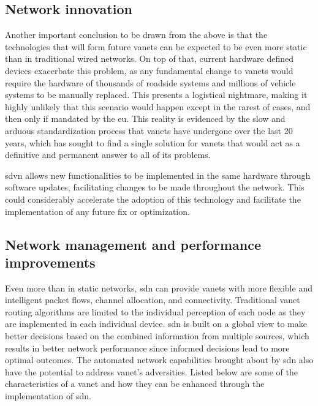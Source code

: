 \subsection{Network innovation}

Another important conclusion to be drawn from the above is that the technologies that will form future \glspl{vanet} can be expected to be even more static than in traditional wired networks. On top of that, current hardware defined devices exacerbate this problem, as any fundamental change to \glspl{vanet} would require the hardware of thousands of roadside systems and millions of vehicle systems to be manually replaced. This presents a logistical nightmare, making it highly unlikely that this scenario would happen except in the rarest of cases, and then only if mandated by the \gls{eu}. This reality is evidenced by the slow and arduous standardization process that \glspl{vanet} have undergone over the last 20 years, which has sought to find a single solution for \glspl{vanet} that would act as a definitive and permanent answer to all of its problems. 

\gls{sdvn} allows new functionalities to be implemented in the same hardware through software updates, facilitating changes to be made throughout the network. This could considerably accelerate the adoption of this technology and facilitate the implementation of any future fix or optimization.

\subsection{Network management and performance improvements}

Even more than in static networks, \gls{sdn} can provide \glspl{vanet} with more flexible and intelligent packet flows, channel allocation, and connectivity. Traditional \gls{vanet} routing algorithms are limited to the individual perception of each node as they are implemented in each individual device. \gls{sdn} is built on a global view to make better decisions based on the combined information from multiple sources, which results in better network performance since informed decisions lead to more optimal outcomes. The automated network capabilities brought about by \gls{sdn} also have the potential to address \gls{vanet}'s adversities. Listed below are some of the characteristics of a \gls{vanet} and how they can be enhanced through the implementation of \gls{sdn}.

